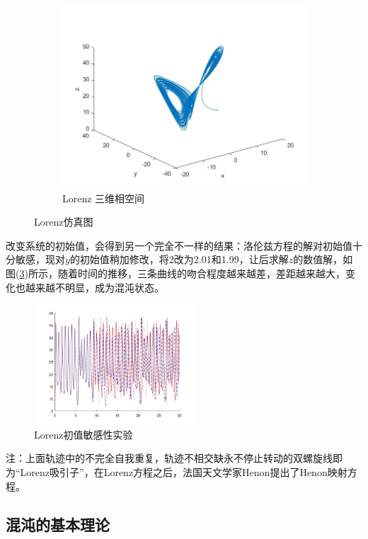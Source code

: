 \begin{figure}[H]
\begin{subfigure}[b]{0.4\textwidth}
	            \includegraphics[width=\textwidth]{images/Lorenzxiangkongjian.jpg}
	            \caption{Lorenz 三维相空间}
	            \label{Lorenz 三维相空间}
	        \end{subfigure}
	        \caption{Lorenz仿真图}
	        \label{Lorenz仿真图}
	    \end{figure}
	    \par
        改变系统的初始值，会得到另一个完全不一样的结果：洛伦兹方程的解对初始值十分敏感，现对$y$的初始值稍加修改，将2改为2.01和1.99，让后求解$z$的数值解，如图(\ref{Lorenz初值敏感性实验})所示，随着时间的推移，三条曲线的吻合程度越来越差，差距越来越大，变化也越来越不明显，成为混沌状态。
        \begin{figure}[H]
        \centering
        \includegraphics[width = 6cm]{images/Lorenzeffect.jpg}
        \caption{Lorenz初值敏感性实验}
        \label{Lorenz初值敏感性实验}
        \end{figure}
        注：上面轨迹中的不完全自我重复，轨迹不相交缺永不停止转动的双螺旋线即为“Lorenz吸引子”，在Lorenz方程之后，法国天文学家Henon提出了Henon映射方程。

    \subsection{混沌的基本理论}
